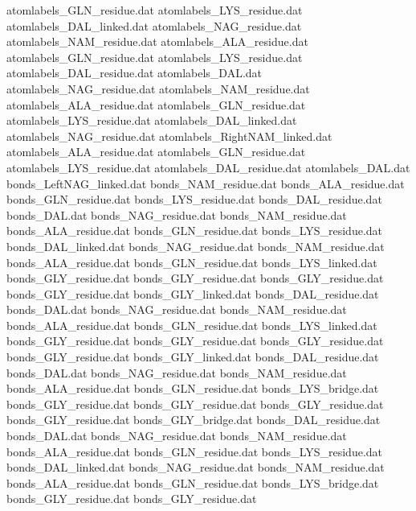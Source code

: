 atomlabels_GLN_residue.dat      
atomlabels_LYS_residue.dat      
atomlabels_DAL_linked.dat       
atomlabels_NAG_residue.dat      
atomlabels_NAM_residue.dat      
atomlabels_ALA_residue.dat      
atomlabels_GLN_residue.dat      
atomlabels_LYS_residue.dat      
atomlabels_DAL_residue.dat      
atomlabels_DAL.dat              
atomlabels_NAG_residue.dat      
atomlabels_NAM_residue.dat      
atomlabels_ALA_residue.dat      
atomlabels_GLN_residue.dat      
atomlabels_LYS_residue.dat      
atomlabels_DAL_linked.dat       
atomlabels_NAG_residue.dat      
atomlabels_RightNAM_linked.dat  
atomlabels_ALA_residue.dat      
atomlabels_GLN_residue.dat      
atomlabels_LYS_residue.dat      
atomlabels_DAL_residue.dat      
atomlabels_DAL.dat              
bonds_LeftNAG_linked.dat        
bonds_NAM_residue.dat           
bonds_ALA_residue.dat           
bonds_GLN_residue.dat           
bonds_LYS_residue.dat           
bonds_DAL_residue.dat           
bonds_DAL.dat                   
bonds_NAG_residue.dat           
bonds_NAM_residue.dat           
bonds_ALA_residue.dat           
bonds_GLN_residue.dat           
bonds_LYS_residue.dat           
bonds_DAL_linked.dat            
bonds_NAG_residue.dat           
bonds_NAM_residue.dat           
bonds_ALA_residue.dat           
bonds_GLN_residue.dat           
bonds_LYS_linked.dat            
bonds_GLY_residue.dat
bonds_GLY_residue.dat
bonds_GLY_residue.dat
bonds_GLY_residue.dat
bonds_GLY_linked.dat
bonds_DAL_residue.dat           
bonds_DAL.dat                   
bonds_NAG_residue.dat           
bonds_NAM_residue.dat           
bonds_ALA_residue.dat           
bonds_GLN_residue.dat           
bonds_LYS_linked.dat            
bonds_GLY_residue.dat
bonds_GLY_residue.dat
bonds_GLY_residue.dat
bonds_GLY_residue.dat
bonds_GLY_linked.dat
bonds_DAL_residue.dat           
bonds_DAL.dat                   
bonds_NAG_residue.dat           
bonds_NAM_residue.dat           
bonds_ALA_residue.dat           
bonds_GLN_residue.dat           
bonds_LYS_bridge.dat            
bonds_GLY_residue.dat
bonds_GLY_residue.dat
bonds_GLY_residue.dat
bonds_GLY_residue.dat
bonds_GLY_bridge.dat
bonds_DAL_residue.dat           
bonds_DAL.dat                   
bonds_NAG_residue.dat           
bonds_NAM_residue.dat           
bonds_ALA_residue.dat           
bonds_GLN_residue.dat           
bonds_LYS_residue.dat           
bonds_DAL_linked.dat            
bonds_NAG_residue.dat           
bonds_NAM_residue.dat           
bonds_ALA_residue.dat           
bonds_GLN_residue.dat           
bonds_LYS_bridge.dat            
bonds_GLY_residue.dat
bonds_GLY_residue.dat
